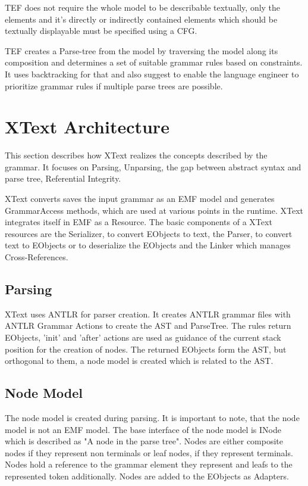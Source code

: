 TEF does not require the whole model to be describable textually, only the elements and it's directly or indirectly contained elements which should be textually displayable must be specified using a CFG.

TEF creates a Parse-tree from the model by traversing the model along its composition and determines a set of suitable grammar rules based on constraints. It uses backtracking for that and \cite{TefPaper} also suggest to enable the language engineer to prioritize grammar rules if multiple parse trees are possible.

\chapter{XText Architecture}
\label{cha:xtextarch}
This section describes how XText realizes the concepts described by the grammar. It focuses on Parsing, Unparsing, the gap between abstract syntax and parse tree, Referential Integrity. 

XText converts saves the input grammar as an EMF model and generates GrammarAccess methods, which are used at various points in the runtime. XText integrates itself in EMF as a Resource.  The basic components of a XText resources are the Serializer, to convert EObjects to text, the Parser, to convert text to EObjects or to deserialize the EObjects and the Linker which manages Cross-References. 
\section{Parsing}
XText uses ANTLR\cite{ANTLR} for parser creation. It creates ANTLR grammar files with ANTLR Grammar Actions to create the AST and ParseTree. The rules return EObjects, 'init' and 'after' actions are used as guidance of the current stack position for the creation of nodes. The returned EObjects form the AST, but orthogonal to them, a node model is created which is related to the AST. 

\section{Node Model}
The node model is created during parsing. It is important to note, that the node model is not an EMF model. The base interface of the node model is INode which  is described as "A node in the parse tree"\cite{XTextAPI}. Nodes are either composite nodes if they represent non terminals or leaf nodes, if they represent terminals. Nodes hold a reference to the grammar element they represent and leafs to the represented token additionally. Nodes are added to the EObjects as Adapters.

